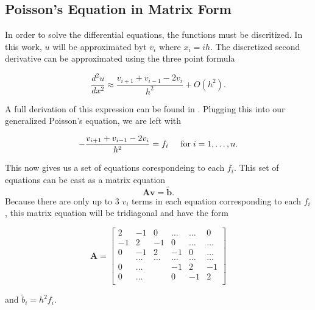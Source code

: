 \documentclass[%
oneside,                 %
final,                   %
10pt]{article}
\begin{document}
\subsection{Poisson's Equation in Matrix Form}

In order to solve the differential equations, the functions must be discritized.  In this work, $u$ will be approximated byt $v_i$ where $x_i=ih$.  The discretized second derivative can be approximated using the three point formula

\begin{equation*}
\frac{d^2u}{dx^2} \approx \frac{v_{i+1} + v_{i-1} - 2v_i}{h^2} + O(h^2).
\end{equation*}
 
A full derivation of this expression can be found in \cite{LectureNotes}. Plugging this into our generalized Poisson's equation, we are left with

\begin{equation*}
   -\frac{v_{i+1}+v_{i-1}-2v_i}{h^2} = f_i  \hspace{0.5cm} \mathrm{for} \hspace{0.1cm} i=1,\dots, n.
\end{equation*}

This now gives us a set of equations corespondeing to each $f_i$.  This set of equations can be cast as a matrix equation
\begin{equation*}
   \mathbf{A}\mathbf{v} = \tilde{\mathbf{b}}.
\end{equation*}
 Because there are only up to 3 $v_i$ terms in each equation corresponding to each $f_i$, this matrix equation will be tridiagonal and have the form

\[
    \mathbf{A} = \begin{bmatrix}
                           2& -1& 0 &\dots   & \dots &0 \\
                           -1 & 2 & -1 &0 &\dots &\dots \\
                           0&-1 &2 & -1 & 0 & \dots \\
                           & \dots   & \dots &\dots   &\dots & \dots \\
                           0&\dots   &  &-1 &2& -1 \\
                           0&\dots    &  & 0  &-1 & 2 \\
                      \end{bmatrix}
\]

and $\tilde{b}_i=h^2f_i$.
\end{document}
